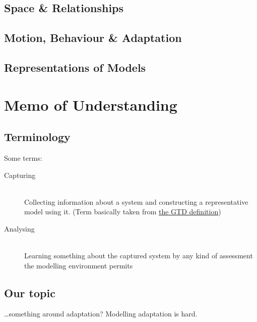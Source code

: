 \documentclass{article}
\begin{document}
\subsection{Space \& Relationships}
\subsection{Motion, Behaviour \& Adaptation}
\subsection{Representations of Models} %


\section{Memo of Understanding} %

\subsection{Terminology}

Some terms:\par
\begin{description}
\item[Capturing]\hfill\\ Collecting information about a system and constructing a representative model using it. (Term
  basically taken from \href{https://gettingthingsdone.com/five-steps/}{the GTD definition})
\item[Analysing]\hfill\\ Learning something about the captured system by any kind of assessment the modelling
  environment permits
\end{description}

\subsection{Our topic}

\ldots{}something around adaptation? Modelling adaptation is hard.



\end{document}
